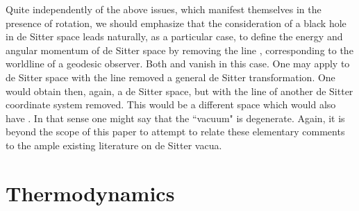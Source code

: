 \documentclass[a4paper,preprintnumbers,amsmath,amssymb]{revtex4}
\begin{document}
Quite independently of the above issues, which manifest themselves in the presence
of rotation, we should emphasize that the consideration of a black hole in de Sitter
space leads naturally, as a particular case, to define the energy and angular momentum
of de Sitter space by removing the line \coordHE{}, corresponding to the worldline of a geodesic observer.
Both \coordHE{} and \coordHE{} vanish in this case. One may apply to de Sitter space with the line
\coordHE{} removed a general de Sitter transformation. One would obtain then, again,
a de Sitter space, but with the line \coordHE{} of another de Sitter coordinate system removed.
This would be a different space which would also have \coordHE{}. In that sense
one might say that the ``vacuum" is degenerate. Again,  it is beyond the scope of this paper to
attempt to relate these elementary comments to the ample existing literature on de Sitter
vacua\cite{bd}.

\section{Thermodynamics}
\end{document}
